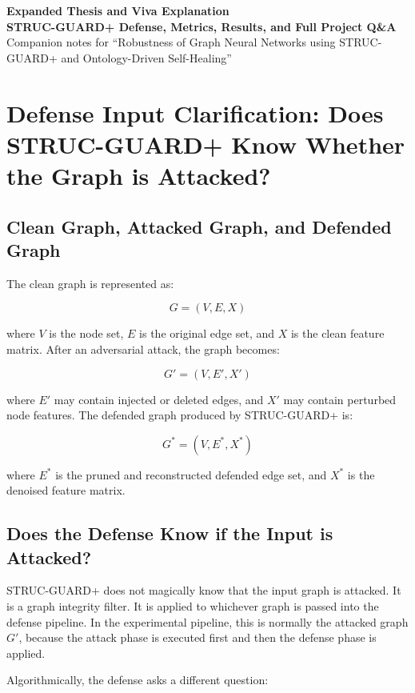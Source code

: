 \documentclass[12pt,a4paper]{article}
\begin{document}
\begin{center}
{\Large \textbf{Expanded Thesis and Viva Explanation}}\\[0.15cm]
{\large \textbf{STRUC-GUARD+ Defense, Metrics, Results, and Full Project Q\&A}}\\[0.15cm]
{\normalsize Companion notes for ``Robustness of Graph Neural Networks using STRUC-GUARD+ and Ontology-Driven Self-Healing''}
\end{center}

\tableofcontents
\newpage

\section{Defense Input Clarification: Does STRUC-GUARD+ Know Whether the Graph is Attacked?}

\subsection{Clean Graph, Attacked Graph, and Defended Graph}
The clean graph is represented as:

$$
G=(V,E,X)
$$

where $V$ is the node set, $E$ is the original edge set, and $X$ is the clean feature matrix. After an adversarial attack, the graph becomes:

$$
G'=(V,E',X')
$$

where $E'$ may contain injected or deleted edges, and $X'$ may contain perturbed node features. The defended graph produced by STRUC-GUARD+ is:

$$
G^*=(V,E^*,X^*)
$$

where $E^*$ is the pruned and reconstructed defended edge set, and $X^*$ is the denoised feature matrix.

\subsection{Does the Defense Know if the Input is Attacked?}
STRUC-GUARD+ does not magically know that the input graph is attacked. It is a graph integrity filter. It is applied to whichever graph is passed into the defense pipeline. In the experimental pipeline, this is normally the attacked graph $G'$, because the attack phase is executed first and then the defense phase is applied.

Algorithmically, the defense asks a different question:
\end{document}
